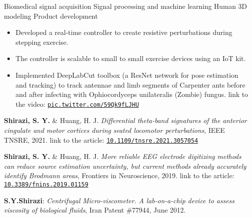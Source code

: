 \begin{outline}
    \1 Biomedical signal acquisition
    \1 Signal processing and machine learning
    \1 Human 3D modeling
    \1 Product development
    
\end{outline}

\begin{itemize}
\item Developed a real-time controller to create resistive perturbations during stepping exercise.
\item The controller is scalable to small to small exercise devices using an IoT kit.
\end{itemize}
\smallskip
{}
\begin{itemize}
\item Implemented DeepLabCut toolbox (a ResNet network for pose estimation and tracking) to track antennae and limb segments of Carpenter ants before and after infecting with Ophiocordyceps unilateralis (Zombie) fungus. {\footnotesize{link to the video:} {\tt{\href{https://pic.twitter.com/59Qk9fLJHU}{pic.twitter.com/59Qk9fLJHU}}}}
\end{itemize}

\smallskip
\textbf{Shirazi, S. Y.} \& Huang, H. J. \textit{Differential theta-band signatures of the anterior cingulate and motor cortices during seated locomotor perturbations}, IEEE TNSRE, 2021. {\footnotesize{link to the article:} {\tt{\href{https://ieeexplore.ieee.org/document/9347561}{10.1109/tnsre.2021.3057054}}}}
\smallskip
\vspace{1ex}

\textbf{Shirazi, S. Y.} \& Huang, H. J. \textit{More reliable EEG electrode digitizing methods can reduce source estimation uncertainty, but current methods already accurately identify Brodmann areas}, Frontiers in Neuroscience, 2019. {\footnotesize{link to the article:} {\tt{\href{https://www.frontiersin.org/articles/10.3389/fnins.2019.01159/}{10.3389/fnins.2019.01159}}}}

\textbf{S.Y.Shirazi}: \textit{Centrifugal Micro-viscometer. A lab-on-a-chip device to assess viscosity of biological fluids}, Iran Patent \#77944, June 2012.
